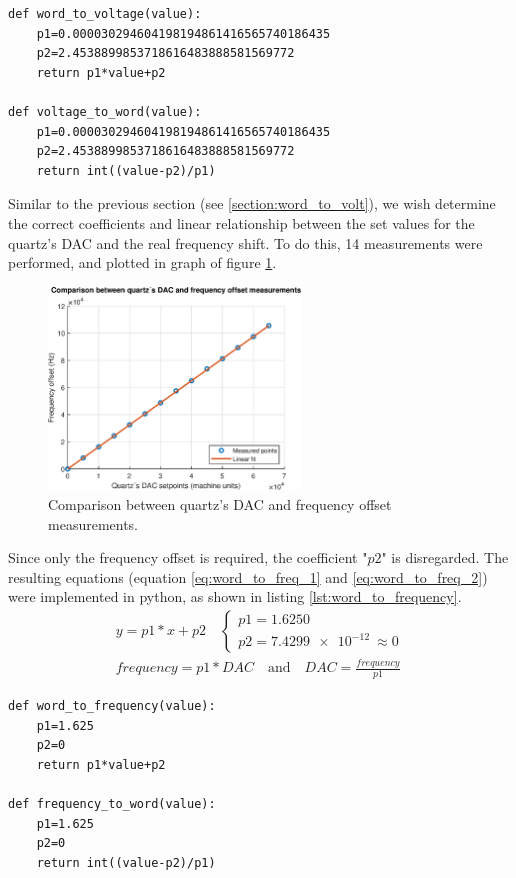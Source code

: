 \documentclass[a4paper,12pt]{article}
\newcounter{subsubsubsection}[subsubsection]
\begin{document}
\begin{lstlisting}[style=python,label={lst:word_to_volt},caption={Python functions to convert machine units to voltage (file: misc.py).},firstnumber=149]
def word_to_voltage(value):
    p1=0.000030294604198194861416565740186435
    p2=2.4538899853718616483888581569772
    return p1*value+p2

def voltage_to_word(value):
    p1=0.000030294604198194861416565740186435
    p2=2.4538899853718616483888581569772
    return int((value-p2)/p1)
\end{lstlisting}

Similar to the previous section (see \ref{section:word_to_volt}), we wish determine the correct coefficients and linear relationship between the set values for the quartz's DAC and the real frequency shift. To do this, 14 measurements were performed, and plotted in graph of figure \ref{fig:word_to_freq}.

\begin{figure}[!h]
    \centering
    \includegraphics[width=0.6\textwidth]{Images/word_to_frequency.eps}
    \captionsetup{justification=centering}
    \caption{Comparison between quartz's DAC and frequency offset measurements.} 
    \label{fig:word_to_freq}
\end{figure}

Since only the frequency offset is required, the coefficient "$p2$" is disregarded. The resulting equations (equation \ref{eq:word_to_freq_1} and \ref{eq:word_to_freq_2}) were implemented in python, as shown in listing \ref{lst:word_to_frequency}.
\begin{align}
y=p1*x+p2\quad
\begin{cases}
p1=1.6250\\ p2=\SI{7.4299e-12}{} \approx 0
\end{cases}
\label{eq:word_to_freq_1}
\\frequency=p1*DAC \quad\text{and}\quad DAC=\frac{frequency}{p1}
\label{eq:word_to_freq_2}
\end{align}
\begin{lstlisting}[style=python,label={lst:word_to_frequency},caption={Python functions to convert machine units to frequency offset (file: misc.py).},firstnumber=159]
def word_to_frequency(value):
    p1=1.625
    p2=0
    return p1*value+p2

def frequency_to_word(value):
    p1=1.625
    p2=0
    return int((value-p2)/p1)
\end{lstlisting}
\end{document}
